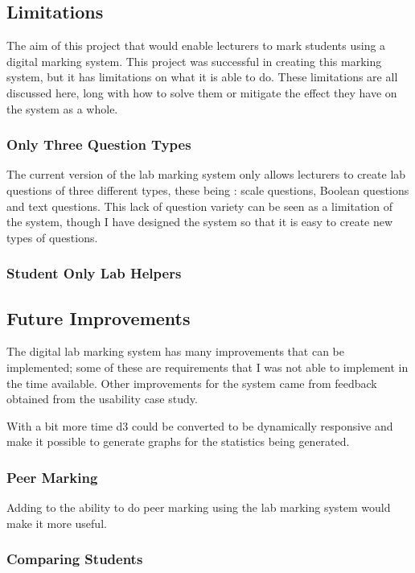 \documentclass[12pt]{article}  %
\begin{document}
\subsection{Limitations}

The aim of this project that would enable lecturers to mark students using a digital marking system. This project was successful in creating this marking system, but it has limitations on what it is able to do. These limitations are all discussed here, long with how to solve them or mitigate the effect they have on the system as a whole.

\subsubsection{Only Three Question Types}

The current version of the lab marking system only allows lecturers to create lab questions of three different types, these being : scale questions, Boolean questions and text questions. This lack of question variety can be seen as a limitation of the system, though I have designed the system so that it is easy to create new types of questions.

\subsubsection{Student Only Lab Helpers}




\subsection{Future Improvements}
The digital lab marking system has many improvements that can be implemented; some of these are requirements that I was not able to implement in the time available. Other improvements for the system came from feedback obtained from the usability case study. 

With a bit more time d3 could be converted to be dynamically responsive and make it possible to generate graphs for the statistics being generated.

\subsubsection{Peer Marking}

Adding to the ability to do peer marking using the lab marking system would make it more useful.

\subsubsection{Comparing Students}
\end{document}
